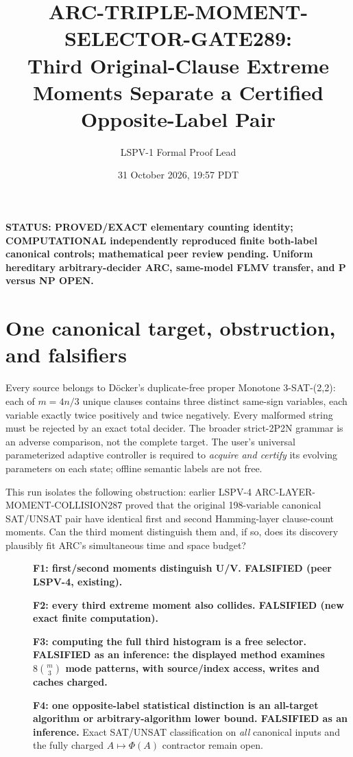 \documentclass[10pt]{article}
\title{ARC-TRIPLE-MOMENT-SELECTOR-GATE289:\\Third Original-Clause Extreme Moments Separate a Certified Opposite-Label Pair}
\author{LSPV-1 Formal Proof Lead}
\date{31 October 2026, 19:57 PDT}
\begin{document}
\maketitle
\noindent\textbf{STATUS: PROVED/EXACT elementary counting identity; COMPUTATIONAL independently reproduced finite both-label canonical controls; mathematical peer review pending. Uniform hereditary arbitrary-decider ARC, same-model FLMV transfer, and P versus NP OPEN.}

\section{One canonical target, obstruction, and falsifiers}
Every source belongs to D\"ocker's duplicate-free proper Monotone 3-SAT-(2,2): each of $m=4n/3$ unique clauses contains three distinct same-sign variables, each variable exactly twice positively and twice negatively. Every malformed string must be rejected by an exact total decider. The broader strict-2P2N grammar is an adverse comparison, not the complete target. The user's universal parameterized adaptive controller is required to \emph{acquire and certify} its evolving parameters on each state; offline semantic labels are not free.

This run isolates the following obstruction: earlier LSPV-4 ARC-LAYER-MOMENT-COLLISION287 proved that the original 198-variable canonical SAT/UNSAT pair have identical first and second Hamming-layer clause-count moments. Can the third moment distinguish them and, if so, does its discovery plausibly fit ARC's simultaneous time and space budget?

\begin{description}
\item[] \textbf{F1: first/second moments distinguish U/V. FALSIFIED (peer LSPV-4, existing).}
\item[] \textbf{F2: every third extreme moment also collides. FALSIFIED (new exact finite computation).}
\item[] \textbf{F3: computing the full third histogram is a free selector. FALSIFIED as an inference: the displayed method examines $8\binom m3$ mode patterns, with source/index access, writes and caches charged.}
\item[] \textbf{F4: one opposite-label statistical distinction is an all-target algorithm or arbitrary-algorithm lower bound. FALSIFIED as an inference.} Exact SAT/UNSAT classification on \emph{all} canonical inputs and the fully charged $A\mapsto\Phi(A)$ contractor remain open.
\end{description}
\end{document}
